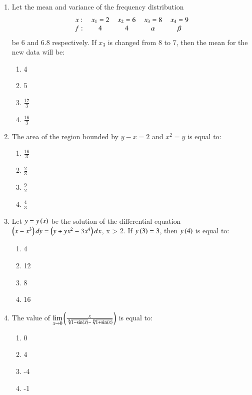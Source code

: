 \documentclass[journal]{IEEEtran}
\begin{document}
\begin{enumerate}
 \item Let the mean and variance of the frequency distribution
 \begin{align*}
    \begin{tabular}{c cccc}
$x:$ & $x_1 = 2$ & $x_2 = 6$ & $x_3 = 8$ & $x_4 = 9$ \\
$f:$ & $4$ & $4$ & $\alpha$ & $\beta$ \\
\end{tabular}
 \end{align*}
 be 6 and 6.8 respectively. If $x_3$ is changed from 8 to 7, then the mean for the new data will be:
 \begin{enumerate}
     \item 4
     \item 5
     \item $\frac{17}{3}$
     \item $\frac{16}{3}$\\
 \end{enumerate}
\item The area of the region bounded by $y - x = 2$ and $x^2 = y$ is equal to:
\begin{enumerate}
     \item $\frac{16}{3}$
     \item $\frac{2}{3}$
     \item $\frac{9}{2}$
     \item $\frac{4}{3}$\\
 \end{enumerate}
\item Let $y = y\left(x\right)$ be the solution of the differential equation $\left(x - x^3\right)dy = \left(y + yx^2 - 3x^4\right)dx$, x > 2. If $y\left(3\right) = 3$, then $y\left(4\right)$ is equal to:
\begin{enumerate}
    \item 4
    \item 12
    \item 8
    \item 16\\
\end{enumerate}
\item The value of $\lim\limits_{x \rightarrow 0}\left(\frac{x}{\sqrt[8]{1-\sin\left(x\right)} - \sqrt[8]{1+\sin\left(x\right)}}\right)$ is equal to:
\begin{enumerate}
    \item 0
    \item 4
    \item -4
    \item -1\\

\end{enumerate}
\end{enumerate}
\end{document}
